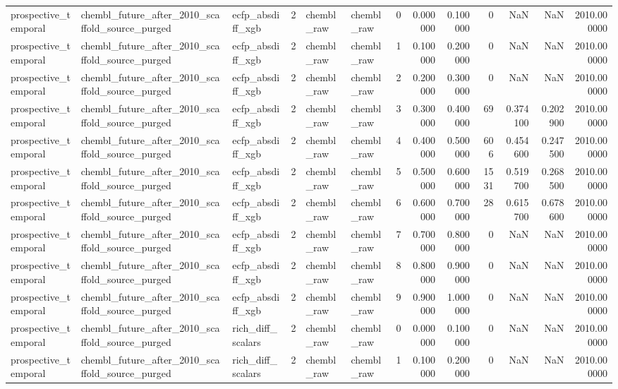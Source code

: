\begin{longtable}{lllrllrrrrrrr}
prospective\_temporal & chembl\_future\_after\_2010\_scaffold\_source\_purged & ecfp\_absdiff\_xgb & 2 & chembl\_raw & chembl\_raw & 0 & 0.000000 & 0.100000 & 0 & NaN & NaN & 2010.000000 \\
prospective\_temporal & chembl\_future\_after\_2010\_scaffold\_source\_purged & ecfp\_absdiff\_xgb & 2 & chembl\_raw & chembl\_raw & 1 & 0.100000 & 0.200000 & 0 & NaN & NaN & 2010.000000 \\
prospective\_temporal & chembl\_future\_after\_2010\_scaffold\_source\_purged & ecfp\_absdiff\_xgb & 2 & chembl\_raw & chembl\_raw & 2 & 0.200000 & 0.300000 & 0 & NaN & NaN & 2010.000000 \\
prospective\_temporal & chembl\_future\_after\_2010\_scaffold\_source\_purged & ecfp\_absdiff\_xgb & 2 & chembl\_raw & chembl\_raw & 3 & 0.300000 & 0.400000 & 69 & 0.374100 & 0.202900 & 2010.000000 \\
prospective\_temporal & chembl\_future\_after\_2010\_scaffold\_source\_purged & ecfp\_absdiff\_xgb & 2 & chembl\_raw & chembl\_raw & 4 & 0.400000 & 0.500000 & 606 & 0.454600 & 0.247500 & 2010.000000 \\
prospective\_temporal & chembl\_future\_after\_2010\_scaffold\_source\_purged & ecfp\_absdiff\_xgb & 2 & chembl\_raw & chembl\_raw & 5 & 0.500000 & 0.600000 & 1531 & 0.519700 & 0.268500 & 2010.000000 \\
prospective\_temporal & chembl\_future\_after\_2010\_scaffold\_source\_purged & ecfp\_absdiff\_xgb & 2 & chembl\_raw & chembl\_raw & 6 & 0.600000 & 0.700000 & 28 & 0.615700 & 0.678600 & 2010.000000 \\
prospective\_temporal & chembl\_future\_after\_2010\_scaffold\_source\_purged & ecfp\_absdiff\_xgb & 2 & chembl\_raw & chembl\_raw & 7 & 0.700000 & 0.800000 & 0 & NaN & NaN & 2010.000000 \\
prospective\_temporal & chembl\_future\_after\_2010\_scaffold\_source\_purged & ecfp\_absdiff\_xgb & 2 & chembl\_raw & chembl\_raw & 8 & 0.800000 & 0.900000 & 0 & NaN & NaN & 2010.000000 \\
prospective\_temporal & chembl\_future\_after\_2010\_scaffold\_source\_purged & ecfp\_absdiff\_xgb & 2 & chembl\_raw & chembl\_raw & 9 & 0.900000 & 1.000000 & 0 & NaN & NaN & 2010.000000 \\
prospective\_temporal & chembl\_future\_after\_2010\_scaffold\_source\_purged & rich\_diff\_scalars & 2 & chembl\_raw & chembl\_raw & 0 & 0.000000 & 0.100000 & 0 & NaN & NaN & 2010.000000 \\
prospective\_temporal & chembl\_future\_after\_2010\_scaffold\_source\_purged & rich\_diff\_scalars & 2 & chembl\_raw & chembl\_raw & 1 & 0.100000 & 0.200000 & 0 & NaN & NaN & 2010.000000 \\

\end{longtable}
